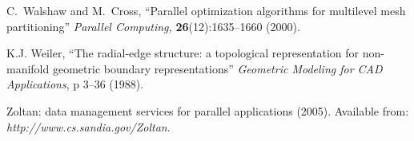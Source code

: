\begin{thebibliography}{99}
C.~Walshaw and M.~Cross, ``Parallel optimization algorithms for multilevel mesh partitioning'' {\it Parallel Computing,} {\bf 26}(12):1635--1660 (2000).

K.J. Weiler, ``The radial-edge structure: a topological representation for
  non-manifold geometric boundary representations'' {\it Geometric Modeling for CAD Applications}, p 3--36 (1988).

 Zoltan: data management services for parallel applications (2005). Available from: {\it http://www.cs.sandia.gov/Zoltan}.

\end{thebibliography}
